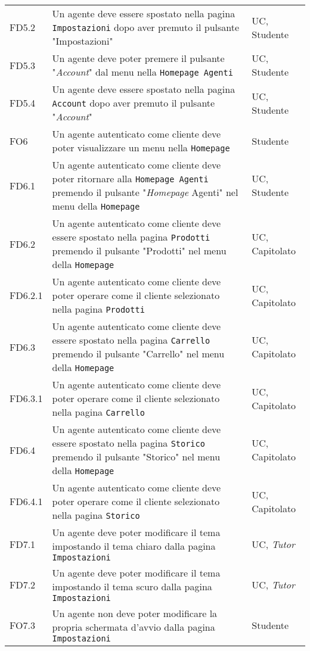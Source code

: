 \begin{center}
\begin{longtable}{|p{2.25cm}|p{7.75cm}|p{2.25cm}|}
    FD5.2 & Un agente deve essere spostato nella pagina \texttt{Impostazioni} dopo aver premuto il pulsante "Impostazioni" & UC, Studente \\
    FD5.3 & Un agente deve poter premere il pulsante "\textit{Account}" dal menu nella \texttt{Homepage Agenti} & UC, Studente \\
    FD5.4 & Un agente deve essere spostato nella pagina \texttt{Account} dopo aver premuto il pulsante "\textit{Account}" & UC, Studente \\
    FO6 & Un agente autenticato come cliente deve poter visualizzare un menu nella \texttt{Homepage} & Studente \\
    FD6.1 & Un agente autenticato come cliente deve poter ritornare alla \texttt{Homepage Agenti} premendo 
            il pulsante "\textit{Homepage} Agenti" nel menu della \texttt{Homepage} & UC, Studente \\
    FD6.2 & Un agente autenticato come cliente deve essere spostato nella pagina \texttt{Prodotti} premendo 
            il pulsante "Prodotti" nel menu della \texttt{Homepage} & UC, Capitolato \\
    FD6.2.1 & Un agente autenticato come cliente deve poter operare come il cliente selezionato nella pagina \texttt{Prodotti} & UC, Capitolato \\
    FD6.3 & Un agente autenticato come cliente deve essere spostato nella pagina \texttt{Carrello} premendo 
            il pulsante "Carrello" nel menu della \texttt{Homepage} & UC, Capitolato \\
    FD6.3.1 & Un agente autenticato come cliente deve poter operare come il cliente selezionato nella pagina \texttt{Carrello} & UC, Capitolato \\
    FD6.4 & Un agente autenticato come cliente deve essere spostato nella pagina \texttt{Storico} premendo 
            il pulsante "Storico" nel menu della \texttt{Homepage} & UC, Capitolato \\
    FD6.4.1 & Un agente autenticato come cliente deve poter operare come il cliente selezionato nella pagina \texttt{Storico} & UC, Capitolato \\
    FD7.1 & Un agente deve poter modificare il tema impostando il tema chiaro dalla pagina \texttt{Impostazioni} & UC, \textit{Tutor} \\
    FD7.2 & Un agente deve poter modificare il tema impostando il tema scuro dalla pagina \texttt{Impostazioni} & UC, \textit{Tutor} \\
    FO7.3 & Un agente non deve poter modificare la propria schermata d'avvio dalla pagina \texttt{Impostazioni} & Studente \\

\end{longtable}
\end{center}
